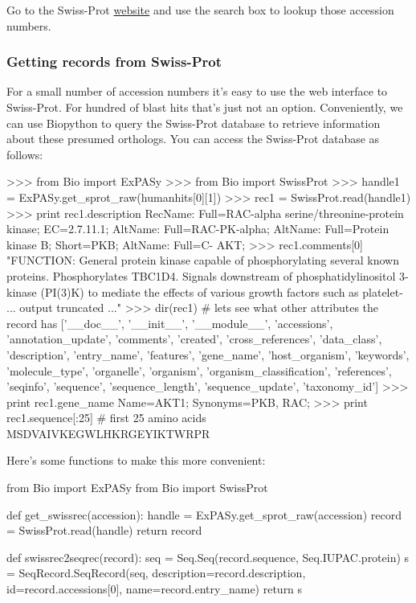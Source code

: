 \documentclass[10pt,letterpaper]{scrartcl}
\begin{document}
Go to the Swiss-Prot \href{http://expasy.org/sprot/}{website} and use the search box to lookup those accession numbers.



\subsubsection*{Getting records from Swiss-Prot}

For a small number of accession numbers it's easy to use the web interface to Swiss-Prot. For hundred of blast hits that's just not an option. Conveniently, we can use Biopython to query the Swiss-Prot database to retrieve information about these presumed orthologs. You can access the Swiss-Prot database as follows:

\begin{python}
>>> from Bio import ExPASy
>>> from Bio import SwissProt
>>> handle1 = ExPASy.get_sprot_raw(humanhits[0][1])
>>> rec1 = SwissProt.read(handle1)
>>> print rec1.description
RecName: Full=RAC-alpha serine/threonine-protein kinase; EC=2.7.11.1; AltName: 
Full=RAC-PK-alpha; AltName: Full=Protein kinase B; Short=PKB; AltName: Full=C-
AKT;
>>> rec1.comments[0]
"FUNCTION: General protein kinase capable of phosphorylating several known 
proteins. Phosphorylates TBC1D4. Signals downstream of phosphatidylinositol 3-
kinase (PI(3)K) to mediate the effects of various growth factors such as platelet-
... output truncated ..."
>>> dir(rec1) # lets see what other attributes the record has
['__doc__', '__init__', '__module__', 'accessions', 'annotation_update', 'comments', 
'created', 'cross_references', 'data_class', 'description', 'entry_name', 'features', 
'gene_name', 'host_organism', 'keywords', 'molecule_type', 'organelle', 'organism', 
'organism_classification', 'references', 'seqinfo', 'sequence', 'sequence_length', 
'sequence_update', 'taxonomy_id']
>>> print rec1.gene_name
Name=AKT1; Synonyms=PKB, RAC;
>>> print rec1.sequence[:25] # first 25 amino acids
MSDVAIVKEGWLHKRGEYIKTWRPR
\end{python}

Here's some functions to make this more convenient:

\begin{python}
from Bio import ExPASy
from Bio import SwissProt

def get_swissrec(accession):
    handle = ExPASy.get_sprot_raw(accession)
    record = SwissProt.read(handle)
    return record
    
def swissrec2seqrec(record):
    seq = Seq.Seq(record.sequence, Seq.IUPAC.protein)
    s = SeqRecord.SeqRecord(seq, description=record.description, 
                id=record.accessions[0], name=record.entry_name)
    return s        
\end{python}
\end{document}
